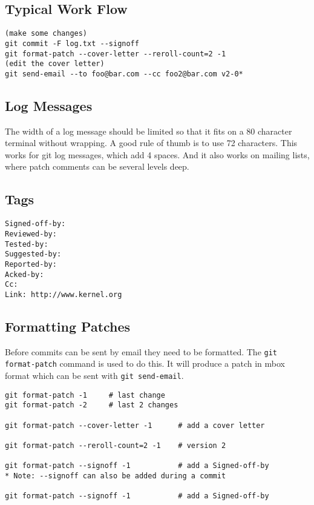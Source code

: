 \documentclass{article}
\begin{document}
\subsection{Typical Work Flow}

\begin{verbatim}
(make some changes)
git commit -F log.txt --signoff
git format-patch --cover-letter --reroll-count=2 -1
(edit the cover letter)
git send-email --to foo@bar.com --cc foo2@bar.com v2-0*
\end{verbatim}

\subsection{Log Messages}

The width of a log message should be limited so that it fits on a 80
character terminal without wrapping.  A good rule of thumb is to use 72
characters.  This works for git log messages, which add 4 spaces.  And
it also works on mailing lists, where patch comments can be several
levels deep.

\subsection{Tags}

\begin{verbatim}
Signed-off-by:
Reviewed-by:
Tested-by:
Suggested-by:
Reported-by:
Acked-by:
Cc:
Link: http://www.kernel.org
\end{verbatim}

\subsection{Formatting Patches}

Before commits can be sent by email they need to be formatted.  The
\verb+git format-patch+ command is used to do this.  It will produce a patch in
mbox format which can be sent with \verb+git send-email+.

\begin{verbatim}
git format-patch -1     # last change
git format-patch -2     # last 2 changes

git format-patch --cover-letter -1      # add a cover letter

git format-patch --reroll-count=2 -1    # version 2

git format-patch --signoff -1           # add a Signed-off-by
* Note: --signoff can also be added during a commit

git format-patch --signoff -1           # add a Signed-off-by
\end{verbatim}
\end{document}
